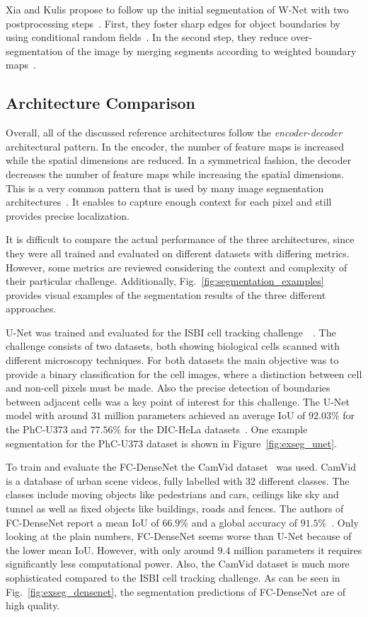 Xia and Kulis propose to follow up the initial segmentation of W-Net with two postprocessing steps~\cite{wnet17}. First, they foster sharp edges for object boundaries by using conditional random fields~\cite{crf17}. In the second step, they reduce over-segmentation of the image by merging segments according to weighted boundary maps~\cite{hierarchy_imgseg11}.

\subsection{Architecture Comparison}
Overall, all of the discussed reference architectures follow the \emph{encoder-decoder} architectural pattern. In the encoder, the number of feature maps is increased while the spatial dimensions are reduced. In a symmetrical fashion, the decoder decreases the number of feature maps while increasing the spatial dimensions. This is a very common pattern that is used by many image segmentation architectures~\cite{imseg_survey20}. It enables to capture enough context for each pixel and still provides precise localization.

It is difficult to compare the actual performance of the three architectures, since they were all trained and evaluated on different datasets with differing metrics. However, some metrics are reviewed considering the context and complexity of their particular challenge. Additionally, Fig.~\ref{fig:segmentation_examples} provides visual examples of the segmentation results of the three different approaches.

U-Net was trained and evaluated for the ISBI cell tracking challenge~\cite{isbi_challenge_online}~\cite{isbi_challenge15}. The challenge consists of two datasets, both showing biological cells scanned with different microscopy techniques. For both datasets the main objective was to provide a binary classification for the cell images, where a distinction between cell and non-cell pixels must be made. Also the precise detection of boundaries between adjacent cells was a key point of interest for this challenge. The U-Net model with around $31$ million parameters achieved an average IoU of $92.03\%$ for the PhC-U373 and $77.56\%$ for the DIC-HeLa datasets~\cite{unet15}. One example segmentation for the PhC-U373 dataset is shown in Figure~\ref{fig:exseg_unet}.

To train and evaluate the FC-DenseNet the CamVid dataset~\cite{camvid_challenge08} was used. CamVid is a database of urban scene videos, fully labelled with 32 different classes. The classes include moving objects like pedestrians and cars, ceilings like sky and tunnel as well as fixed objects like buildings, roads and fences. The authors of FC-DenseNet report a mean IoU of $66.9\%$ and a global accuracy of $91.5\%$~\cite{denseseg17}. Only looking at the plain numbers, FC-DenseNet seems worse than U-Net because of the lower mean IoU. However, with only around $9.4$ million parameters it requires significantly less computational power. Also, the CamVid dataset is much more sophisticated compared to the ISBI cell tracking challenge. As can be seen in Fig.~\ref{fig:exseg_densenet}, the segmentation predictions of FC-DenseNet are of high quality.

